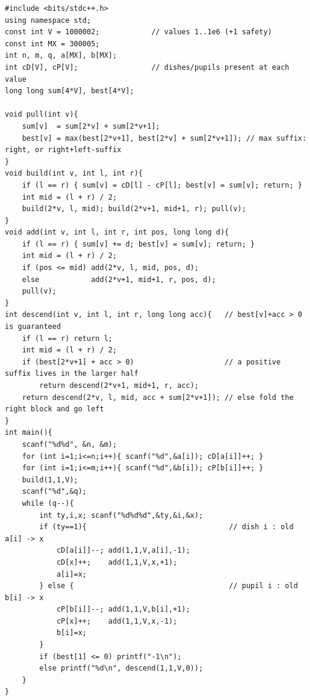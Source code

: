 \begin{lstlisting}[caption={CF 1179C full solution: value-indexed (sum,max-suffix) tree + descend}, label={lst:c13-1179-soln}]
#include <bits/stdc++.h>
using namespace std;
const int V = 1000002;            // values 1..1e6 (+1 safety)
const int MX = 300005;
int n, m, q, a[MX], b[MX];
int cD[V], cP[V];                 // dishes/pupils present at each value
long long sum[4*V], best[4*V];

void pull(int v){
    sum[v]  = sum[2*v] + sum[2*v+1];
    best[v] = max(best[2*v+1], best[2*v] + sum[2*v+1]); // max suffix: right, or right+left-suffix
}
void build(int v, int l, int r){
    if (l == r) { sum[v] = cD[l] - cP[l]; best[v] = sum[v]; return; }
    int mid = (l + r) / 2;
    build(2*v, l, mid); build(2*v+1, mid+1, r); pull(v);
}
void add(int v, int l, int r, int pos, long long d){
    if (l == r) { sum[v] += d; best[v] = sum[v]; return; }
    int mid = (l + r) / 2;
    if (pos <= mid) add(2*v, l, mid, pos, d);
    else            add(2*v+1, mid+1, r, pos, d);
    pull(v);
}
int descend(int v, int l, int r, long long acc){   // best[v]+acc > 0 is guaranteed
    if (l == r) return l;
    int mid = (l + r) / 2;
    if (best[2*v+1] + acc > 0)                     // a positive suffix lives in the larger half
        return descend(2*v+1, mid+1, r, acc);
    return descend(2*v, l, mid, acc + sum[2*v+1]); // else fold the right block and go left
}
int main(){
    scanf("%d%d", &n, &m);
    for (int i=1;i<=n;i++){ scanf("%d",&a[i]); cD[a[i]]++; }
    for (int i=1;i<=m;i++){ scanf("%d",&b[i]); cP[b[i]]++; }
    build(1,1,V);
    scanf("%d",&q);
    while (q--){
        int ty,i,x; scanf("%d%d%d",&ty,&i,&x);
        if (ty==1){                                 // dish i : old a[i] -> x
            cD[a[i]]--; add(1,1,V,a[i],-1);
            cD[x]++;    add(1,1,V,x,+1);
            a[i]=x;
        } else {                                    // pupil i : old b[i] -> x
            cP[b[i]]--; add(1,1,V,b[i],+1);
            cP[x]++;    add(1,1,V,x,-1);
            b[i]=x;
        }
        if (best[1] <= 0) printf("-1\n");
        else printf("%d\n", descend(1,1,V,0));
    }
}
\end{lstlisting}

